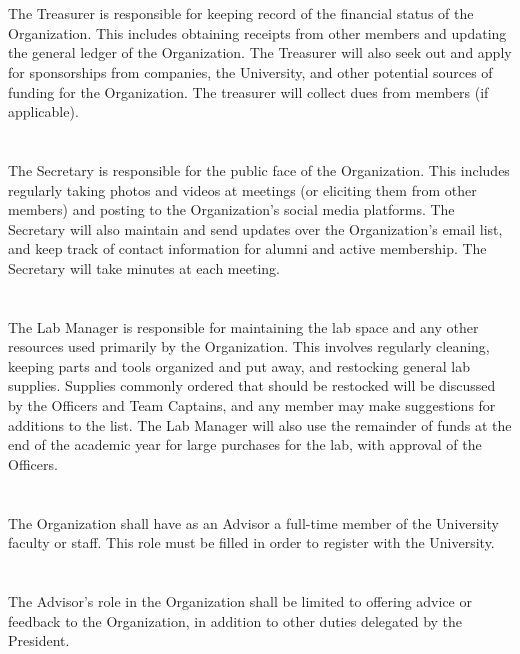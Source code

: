 \documentclass[12pt]{cls/constitution}
\begin{document}
\section{}
The Treasurer is responsible for keeping record of the financial status of the Organization. This includes obtaining receipts from other members and updating the general ledger of the Organization. The Treasurer will also seek out and apply for sponsorships from companies, the University, and other potential sources of funding for the Organization. The treasurer will collect dues from members (if applicable).

\section{}
The Secretary is responsible for the public face of the Organization. This includes regularly taking photos and videos at meetings (or eliciting them from other members) and posting to the Organization's social media platforms. The Secretary will also maintain and send updates over the Organization's email list, and keep track of contact information for alumni and active membership. The Secretary will take minutes at each meeting.

\section{}
The Lab Manager is responsible for maintaining the lab space and any other resources used primarily by the Organization. This involves regularly cleaning, keeping parts and tools organized and put away, and restocking general lab supplies. Supplies commonly ordered that should be restocked will be discussed by the Officers and Team Captains, and any member may make suggestions for additions to the list. The Lab Manager will also use the remainder of funds at the end of the academic year for large purchases for the lab, with approval of the Officers.

\section{}
The Organization shall have as an Advisor a full-time member of the University faculty or staff. This role must be filled in order to register with the University.

\section{}
The Advisor’s role in the Organization shall be limited to offering advice or feedback to the Organization, in addition to other duties delegated by the President.
\end{document}
